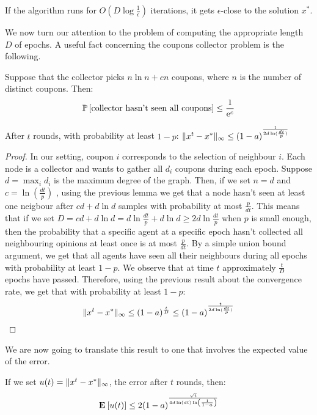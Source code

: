 \begin{corollary}
If the algorithm runs for $O(D \log \frac{1}{\epsilon})$ iterations, it gets $\epsilon$-close to the solution $x^*$.
\end{corollary}

We now turn our attention to the problem of computing the appropriate length $D$ of epochs. A useful fact concerning the coupons collector problem is the following.

\begin{lemma}
Suppose that the collector picks $n\ln n + cn$ coupons, where $n$ is the number of distinct coupons. Then:
$$
\mathbb{P}\left[\text{collector hasn't seen all coupons}\right] \leq \frac{1}{\mathrm{e}^c}
$$
\end{lemma}

\begin{theorem}
After $t$ rounds, with probability at least $1 - p$: $\| x^{t}-x^* \|_{\infty} \leq (1-a)^{\frac{t}{2d\ln( \frac{dt}{p})} }$
\end{theorem}
\begin{proof}
In our setting, coupon $i$ corresponds to the selection of neighbour $i$. Each node is a collector and wants to gather all $d_i$ coupons during each epoch. Suppose $d = \max_i d_i$ is the maximum degree of the graph. Then, if we set $n = d$ and $c = \ln (\frac{dt}{p})$ , using the previous lemma we get that a node hasn't seen at least one neigbour after $cd + d\ln d$ samples with probability at most $\frac{p}{dt}$. This means that if we set $D = cd + d\ln d = d \ln \frac{dt}{p} + d \ln d \geq 2d\ln\frac{dt}{p} $ when $p$ is small enough, then the probability that a specific agent at a specific epoch hasn't collected all neighbouring opinions at least once is at most $\frac{p}{dt}$. By a simple union bound argument, we get that all agents have seen all their neighbours during all epochs with probability at least $1 - p$. We observe that at time $t$ approximately $\frac{t}{D}$ epochs have passed. Therefore, using the previous result about the convergence rate, we get that with probability at least $1 - p$:
$$ \| x^{t}-x^* \|_{\infty} \leq (1-a)^{\frac{t}{D}} \leq (1-a)^{\frac{t}{2d\ln( \frac{dt}{p})} }$$

\end{proof}
We are now going to translate this result to one that involves the expected value of the error.
\begin{theorem}If we set $u(t) = \| x^t-x^* \|_{\infty}$, the error after $t$ rounds, then:
$$
\Exp{u(t)} \leq 2(1-a)^{\frac{\sqrt{t}}{4d\ln(dt)\ln\lp( \frac{1}{1-a}\rp)}}
$$
\end{theorem}
